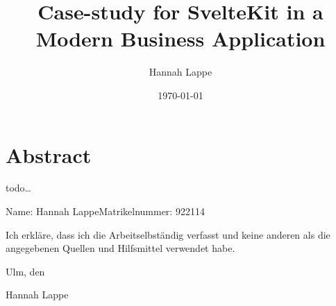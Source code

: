 \documentclass[
a4paper, 
DIV=15, 
headsepline, 
numbers=noenddot,
bibliography=totoc,
BCOR=15mm,
leqno,
]{scrbook}
\title{Case-study for SvelteKit in a Modern Business Application}
\author{Hannah Lappe}
\date{\today}
\newcommand{\fullname}{Hannah Lappe}
\newcommand{\matrikelnummer}{922114}
\begin{document}
\maketitle

\cleardoublepage

\section*{Abstract}
todo\dots

\tableofcontents








\cleardoublepage %
\printbibliography

\clearpage
\thispagestyle{empty}


\noindent Name: \fullname \hfill Matrikelnummer: \matrikelnummer \vspace{2cm}


Ich erkläre, dass ich die Arbeitselbständig verfasst und keine anderen als die angegebenen Quellen und Hilfsmittel verwendet habe.\vspace{2cm}

\noindent Ulm, den \dotfill

\hspace{10cm} {\footnotesize \fullname}
\end{document}

